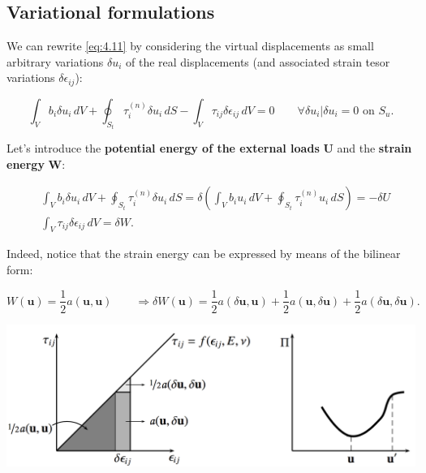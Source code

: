 \subsection{Variational formulations}
	We can rewrite \eqref{eq:4.11} by considering the virtual displacements as small arbitrary variations $\delta u_i$ of the real displacements (and associated strain tesor variations $\delta \epsilon _{ij}$): 
	
	\begin{equation}
	\int _V b_i \delta u_i \, dV +\oint _{S_t} \tau _{i}^{(n)} \delta u_i \, dS - \int _V \tau _{ij} \delta\epsilon_{ij} \, dV = 0 \qquad \forall \delta u_i | \delta u_i = 0 \mbox{ on } S_u.
	\end{equation}
	
	Let's introduce the \textbf{potential energy of the external loads} $\bm{U}$ and the \textbf{strain energy} $\bm{W}$:
	
	\begin{equation}
	\begin{aligned}
	&\int _V b_i \delta u_i \, dV +\oint _{S_t} \tau _{i}^{(n)} \delta u_i \, dS = \delta \left( \int _V b_i u_i \, dV +\oint _{S_t} \tau _{i}^{(n)} u_i \, dS \right)= - \delta U \\
	&\int _V \tau _{ij} \delta\epsilon_{ij} \, dV = \delta W.
	\end{aligned}
	\end{equation}
	
	Indeed, notice that the strain energy can be expressed by means of the bilinear form:
	
	\begin{equation}
	W(\bm{u}) = \frac{1}{2} a(\bm{u},\bm{u}) \qquad \Rightarrow \delta W(\bm{u}) = \frac{1}{2}a(\delta \bm{u}, \bm{u}) + \frac{1}{2}a(\bm{u}, \delta\bm{u}) +\frac{1}{2}a(\delta \bm{u}, \delta \bm{u}). 
	\end{equation}
	
	\begin{center}
	\includegraphics[scale=0.4]{ch4/2}
	\label{fig:4.2}
	\end{center}
	
